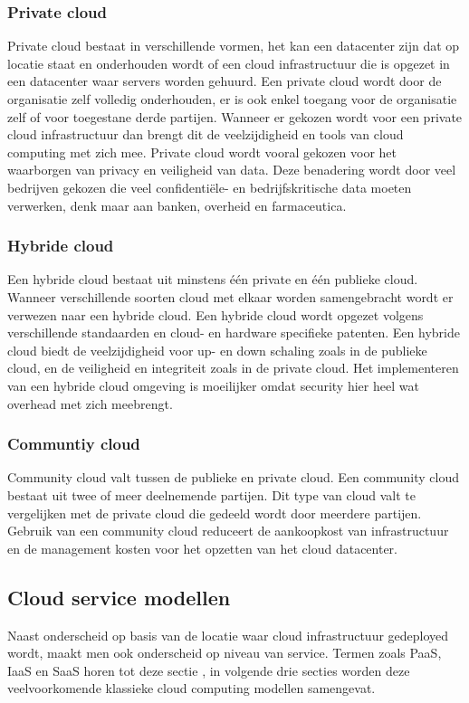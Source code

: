 \subsubsection{Private cloud}
Private cloud bestaat in verschillende vormen, het kan een datacenter zijn dat op locatie staat en onderhouden wordt of een cloud infrastructuur die is opgezet in een datacenter waar servers worden gehuurd. Een private cloud wordt door de organisatie zelf volledig onderhouden, er is ook enkel toegang voor de organisatie zelf of voor toegestane derde partijen. Wanneer er gekozen wordt voor een private cloud infrastructuur dan brengt dit de veelzijdigheid en tools van cloud computing met zich mee. Private cloud wordt vooral gekozen voor het waarborgen van privacy en veiligheid van data. Deze benadering wordt door veel bedrijven gekozen die veel confidentiële- en bedrijfskritische data moeten verwerken, denk maar aan banken, overheid en farmaceutica.

\subsubsection{Hybride cloud}
Een hybride cloud bestaat uit minstens één private en één publieke cloud. Wanneer verschillende soorten cloud met elkaar worden samengebracht wordt er verwezen naar een hybride cloud. Een hybride cloud wordt opgezet volgens verschillende standaarden en cloud- en hardware specifieke patenten. Een hybride cloud biedt de veelzijdigheid voor up- en down schaling zoals in de publieke cloud, en de veiligheid en integriteit zoals in de private cloud. Het implementeren van een hybride cloud omgeving is moeilijker omdat security hier heel wat overhead met zich meebrengt.

\subsubsection{Communtiy cloud}
Community cloud valt tussen de publieke en private cloud. Een community cloud bestaat uit twee of meer deelnemende partijen. Dit type van cloud valt te vergelijken met de private cloud die gedeeld wordt door meerdere partijen. Gebruik van een community cloud reduceert de aankoopkost van infrastructuur en de management kosten voor het opzetten van het cloud datacenter.


\subsection{Cloud service modellen}
\label{cloud-service-level}
Naast onderscheid op basis van de locatie waar cloud infrastructuur gedeployed wordt, maakt men ook onderscheid op niveau van service. Termen zoals PaaS, IaaS en SaaS horen tot deze sectie \autocite{Goyal2014}, in volgende drie secties worden deze veelvoorkomende klassieke cloud computing modellen samengevat.

